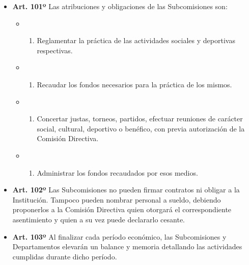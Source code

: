 \documentclass[]{book}
\providecommand{\tightlist}{%
  \setlength{\itemsep}{0pt}\setlength{\parskip}{0pt}}
\begin{document}
\begin{itemize}
\tightlist
\item
  \textbf{Art. 101º} Las atribuciones y obligaciones de las
  Subcomisiones son:

  \begin{itemize}
  \item
    \begin{enumerate}
    \def\labelenumi{\alph{enumi})}
    \tightlist
    \item
      Reglamentar la práctica de las actividades sociales y deportivas
      respectivas.
    \end{enumerate}
  \item
    \begin{enumerate}
    \def\labelenumi{\alph{enumi})}
    \setcounter{enumi}{1}
    \tightlist
    \item
      Recaudar los fondos necesarios para la práctica de los mismos.
    \end{enumerate}
  \item
    \begin{enumerate}
    \def\labelenumi{\alph{enumi})}
    \setcounter{enumi}{2}
    \tightlist
    \item
      Concertar justas, torneos, partidos, efectuar reuniones de
      carácter social, cultural, deportivo o benéfico, con previa
      autorización de la Comisión Directiva.
    \end{enumerate}
  \item
    \begin{enumerate}
    \def\labelenumi{\alph{enumi})}
    \setcounter{enumi}{3}
    \tightlist
    \item
      Administrar los fondos recaudados por esos medios.
    \end{enumerate}
  \end{itemize}
\end{itemize}

\begin{itemize}
\tightlist
\item
  \textbf{Art. 102º} Las Subcomisiones no pueden firmar contratos ni
  obligar a la Institución. Tampoco pueden nombrar personal a sueldo,
  debiendo proponerlos a la Comisión Directiva quien otorgará el
  correspondiente asentimiento y quien a su vez puede declararlo
  cesante.
\end{itemize}

\begin{itemize}
\tightlist
\item
  \textbf{Art. 103º} Al finalizar cada período económico, las
  Subcomisiones y Departamentos elevarán un balance y memoria detallando
  las actividades cumplidas durante dicho período.
\end{itemize}
\end{document}
